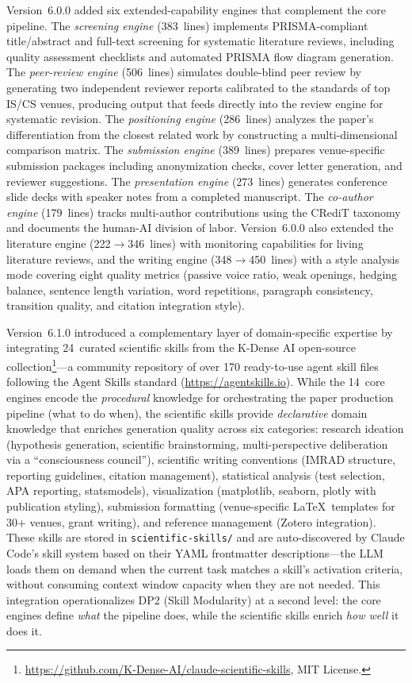 \documentclass{article}
\begin{document}
Version~6.0.0 added six extended-capability engines that complement the core pipeline. The \emph{screening engine} (383~lines) implements PRISMA-compliant title/abstract and full-text screening for systematic literature reviews, including quality assessment checklists and automated PRISMA flow diagram generation. The \emph{peer-review engine} (506~lines) simulates double-blind peer review by generating two independent reviewer reports calibrated to the standards of top IS/CS venues, producing output that feeds directly into the review engine for systematic revision. The \emph{positioning engine} (286~lines) analyzes the paper's differentiation from the closest related work by constructing a multi-dimensional comparison matrix. The \emph{submission engine} (389~lines) prepares venue-specific submission packages including anonymization checks, cover letter generation, and reviewer suggestions. The \emph{presentation engine} (273~lines) generates conference slide decks with speaker notes from a completed manuscript. The \emph{co-author engine} (179~lines) tracks multi-author contributions using the CRediT taxonomy and documents the human-AI division of labor. Version~6.0.0 also extended the literature engine (222$\to$346~lines) with monitoring capabilities for living literature reviews, and the writing engine (348$\to$450~lines) with a style analysis mode covering eight quality metrics (passive voice ratio, weak openings, hedging balance, sentence length variation, word repetitions, paragraph consistency, transition quality, and citation integration style).

Version~6.1.0 introduced a complementary layer of domain-specific expertise by integrating 24~curated scientific skills from the K-Dense AI open-source collection\footnote{\url{https://github.com/K-Dense-AI/claude-scientific-skills}, MIT License.}---a community repository of over 170 ready-to-use agent skill files following the Agent Skills standard (\url{https://agentskills.io}). While the 14~core engines encode the \emph{procedural} knowledge for orchestrating the paper production pipeline (what to do when), the scientific skills provide \emph{declarative} domain knowledge that enriches generation quality across six categories: research ideation (hypothesis generation, scientific brainstorming, multi-perspective deliberation via a ``consciousness council''), scientific writing conventions (IMRAD structure, reporting guidelines, citation management), statistical analysis (test selection, APA reporting, statsmodels), visualization (matplotlib, seaborn, plotly with publication styling), submission formatting (venue-specific \LaTeX\ templates for 30+ venues, grant writing), and reference management (Zotero integration). These skills are stored in \texttt{scientific-skills/} and are auto-discovered by Claude Code's skill system based on their YAML frontmatter descriptions---the LLM loads them on demand when the current task matches a skill's activation criteria, without consuming context window capacity when they are not needed. This integration operationalizes DP2 (Skill Modularity) at a second level: the core engines define \emph{what} the pipeline does, while the scientific skills enrich \emph{how well} it does it.
\end{document}
